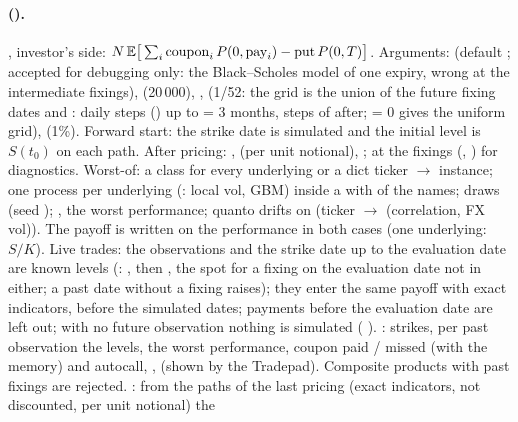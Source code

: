 \paragraph{ ().} , investor's side:
$N\,\mathbb{E}\big[\sum_i \text{coupon}_i\,P(0,\text{pay}_i) - \text{put}\,P(0,T)\big]$. Arguments:  (default
;  accepted for debugging only: the Black--Scholes model of
one expiry, wrong at the intermediate fixings),  (20\,000), ,  (1/52: the grid is the
union of the future fixing dates and : daily steps () up to
 = 3 months, steps of  after;  = 0 gives the uniform
grid),  (1\%). Forward start: the
strike date is simulated and the initial level is $S(t_0)$ on each path. After pricing: ,
 (per unit notional), ;  at the fixings
(, ) for diagnostics. Worst-of:  a class for every
underlying or a dict ticker $\to$ instance; one process per underlying (: local vol, GBM)
inside a  with  of the  names; draws
 (seed \code{[seed, 0]});  ,
 the worst performance; quanto drifts on  (ticker $\to$ (correlation,
FX vol)). The payoff is written on the performance in both cases (one underlying: $S/K$). Live trades: the
observations and the strike date up to the evaluation date are known levels (:
, then , the spot for a fixing on the evaluation date not in
either; a past date without a fixing raises); they enter the same payoff with exact indicators, before the simulated
dates; payments before the evaluation date are left out; with no future observation nothing is simulated
( ). : strikes, per past observation the
levels, the worst performance, coupon paid / missed (with the memory) and autocall, ,
 (shown by the Tradepad). Composite products with past fixings are rejected.
: from the paths of the last pricing (exact indicators, not discounted, per unit notional) the
